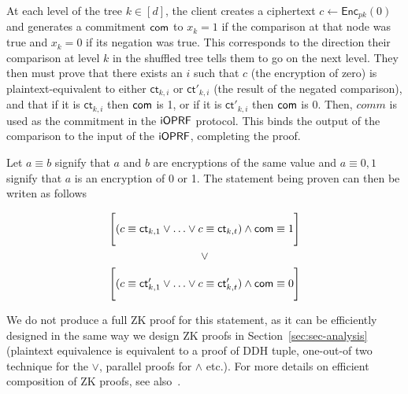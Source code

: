 At each level of the tree $k\in[d]$, the client creates a ciphertext
$c \leftarrow \mathsf{Enc}_{pk}(0)$ and generates a commitment  $\mathsf{com}$ to
$x_k=1$ if the comparison at that node was true and $x_k=0$ if its
negation was true.  This corresponds to the direction their comparison
at level $k$ in the shuffled tree tells them to go on the next level.
They then must prove that there exists an $i$ such that $c$ (the
encryption of zero) is plaintext-equivalent to either
$\mathsf{ct}_{k,i}$ or $\mathsf{ct}'_{k,i}$ (the result of the negated
comparison), and that if it is $\mathsf{ct}_{k,i}$ then $\mathsf{com}$ is 1, or
if it is $\mathsf{ct}'_{k,i}$ then $\mathsf{com}$ is 0.  Then, $comm$ is used
as the commitment in the $\mathsf{i}\mathsf{OPRF}$ protocol.  This binds the output of
the comparison to the input of the $\mathsf{i}\mathsf{OPRF}$, completing the proof.

Let $a \equiv b$ signify that $a$ and $b$ are encryptions of the same
value and $a \equiv {0,1}$ signify that $a$ is an encryption of 0 or
1.  The statement being proven can then be writen as follows

\begin{gather*}
\Bigg [ (c \equiv \mathsf{ct}_{k,1} \lor  \ldots \lor c \equiv
\mathsf{ct}_{k,t}) \land \mathsf{com} \equiv 1 \Bigg ] \\\lor\\ \Bigg [ (c \equiv
\mathsf{ct}'_{k,1} \lor  \ldots \lor c \equiv \mathsf{ct}'_{k,t})
\land \mathsf{com} \equiv 0 \Bigg ] 
\end{gather*}
  
We do not produce a full ZK proof for this statement, as it can be
efficiently designed in the same way we design ZK proofs in
Section~\ref{sec:sec-analysis} (plaintext equivalence is equivalent to
a proof of DDH tuple, one-out-of two technique for the $\lor$,
parallel proofs for $\land$ etc.).  For more details on efficient
composition of ZK proofs, see also~\citet{camenisch1997proof}.

